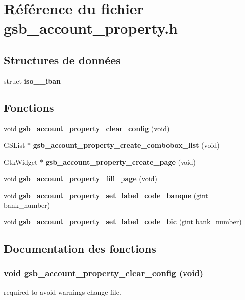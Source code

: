 \section{Référence du fichier gsb\_\-account\_\-property.h}
\label{gsb__account__property_8h}
\subsection*{Structures de données}
\begin{DoxyCompactItemize}
\item 
struct {\bf iso\_\_\-iban}
\end{DoxyCompactItemize}
\subsection*{Fonctions}
\begin{DoxyCompactItemize}
\item 
void {\bf gsb\_\-account\_\-property\_\-clear\_\-config} (void)
\item 
GSList $\ast$ {\bf gsb\_\-account\_\-property\_\-create\_\-combobox\_\-list} (void)
\item 
GtkWidget $\ast$ {\bf gsb\_\-account\_\-property\_\-create\_\-page} (void)
\item 
void {\bf gsb\_\-account\_\-property\_\-fill\_\-page} (void)
\item 
void {\bf gsb\_\-account\_\-property\_\-set\_\-label\_\-code\_\-banque} (gint bank\_\-number)
\item 
void {\bf gsb\_\-account\_\-property\_\-set\_\-label\_\-code\_\-bic} (gint bank\_\-number)
\end{DoxyCompactItemize}


\subsection{Documentation des fonctions}
\subsubsection[{gsb\_\-account\_\-property\_\-clear\_\-config}]{\setlength{\rightskip}{0pt plus 5cm}void gsb\_\-account\_\-property\_\-clear\_\-config (void)}\label{gsb__account__property_8h_a92437e45d23b702bc6eba7e601208861}
required to avoid warnings change file. 

